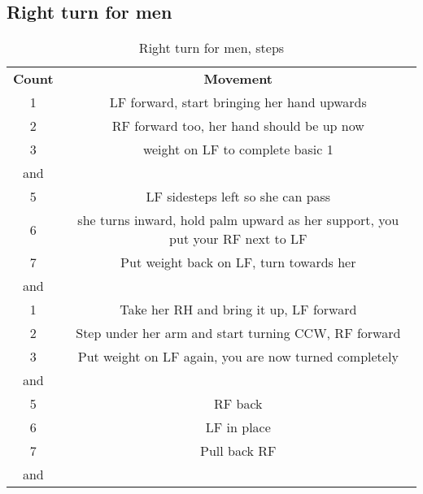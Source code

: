 \subsection{Right turn for men}
\begin{table}[H]
\centering
\begin{tabular}{cc}
  \toprule
  \textbf{Count} & \textbf{Movement}\\
  \cmidrule(lr){1-1}\cmidrule(lr){2-2}
  1 & LF forward, start bringing her hand upwards\\
  2 & RF forward too, her hand should be up now\\
  3 & weight on LF to complete basic 1\\
  and & \\
  5 & LF sidesteps left so she can pass\\
  6 & she turns inward, hold palm upward as her support, you put your RF next to LF\\
  7 & Put weight back on LF, turn towards her\\
  and & \\
  1 & Take her RH and bring it up, LF forward\\
  2 & Step under her arm and start turning CCW, RF forward\\
  3 & Put weight on LF again, you are now turned completely\\
  and & \\
  5 & RF back\\
  6 & LF in place\\
  7 & Pull back RF\\
  and & \\
  \bottomrule
\end{tabular}
\label{right_turn_for_men_steps}
\caption{Right turn for men, steps}
\end{table}

